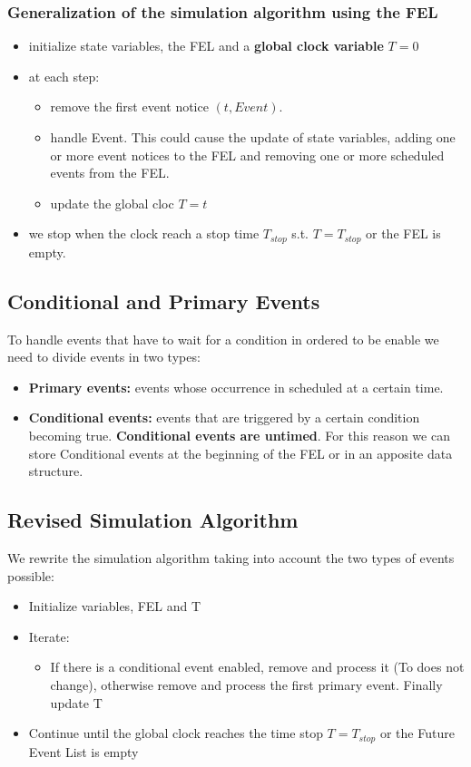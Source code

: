 \subsubsection{Generalization of the simulation algorithm using the FEL}
\begin{itemize}
    \item initialize state variables, the FEL and a \textbf{global clock variable} $T = 0$
    \item at each step:
        \begin{itemize}
            \item remove the first event notice $(t, Event)$.
            \item handle Event. This could cause the update of state variables, adding one or more event notices to the FEL and removing one or more scheduled events from the FEL.
            \item update the global cloc $T = t$
        \end{itemize}

    \item we stop when the clock reach a stop time $T_{stop}$ s.t. $T = T_{stop}$ or the FEL is empty. 
\end{itemize}

\subsection{Conditional and Primary Events}
To handle events that have to wait for a condition in ordered to be enable we need to divide events in two types:

\begin{itemize}
    \item \textbf{Primary events:} events whose occurrence in scheduled at a certain time.
    \item \textbf{Conditional events:} events that are triggered by a certain condition becoming true. \textbf{Conditional events are untimed}. For this reason we can store Conditional events at the beginning of the FEL or in an apposite data structure.
\end{itemize}

\subsection{Revised Simulation Algorithm}
We rewrite the simulation algorithm taking into account the two types of events possible:
\begin{itemize}
    \item Initialize variables, FEL and T
    \item Iterate:
        \begin{itemize}
            \item If there is a conditional event enabled, remove and process it (To does not change), otherwise remove and process the first primary event. Finally update T
        \end{itemize}
    \item Continue until the global clock reaches the time stop $T = T_{stop}$ or the Future Event List is empty 
\end{itemize}
